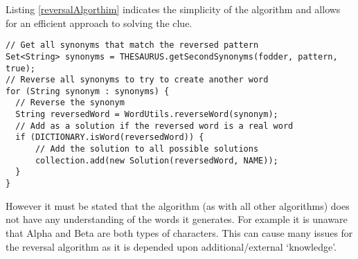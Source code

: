 Listing \ref{reversalAlgorthim} indicates the simplicity of the algorithm and 
allows for an efficient approach to solving the clue.

\begin{lstlisting}[caption={Core reversal algorthim deducing possbile solutions},
                   label=reversalAlgorthim]  
// Get all synonyms that match the reversed pattern
Set<String> synonyms = THESAURUS.getSecondSynonyms(fodder, pattern, true);
// Reverse all synonyms to try to create another word
for (String synonym : synonyms) {
  // Reverse the synonym
  String reversedWord = WordUtils.reverseWord(synonym);
  // Add as a solution if the reversed word is a real word
  if (DICTIONARY.isWord(reversedWord)) {
      // Add the solution to all possible solutions
      collection.add(new Solution(reversedWord, NAME));
  }
}
\end{lstlisting}

However it must be stated that the algorithm (as with all other algorithms) does
not have any understanding of the words it generates. For example it is unaware
that Alpha and Beta are both types of characters. This can cause many issues for
the reversal algorithm as it is depended upon additional/external `knowledge'.
